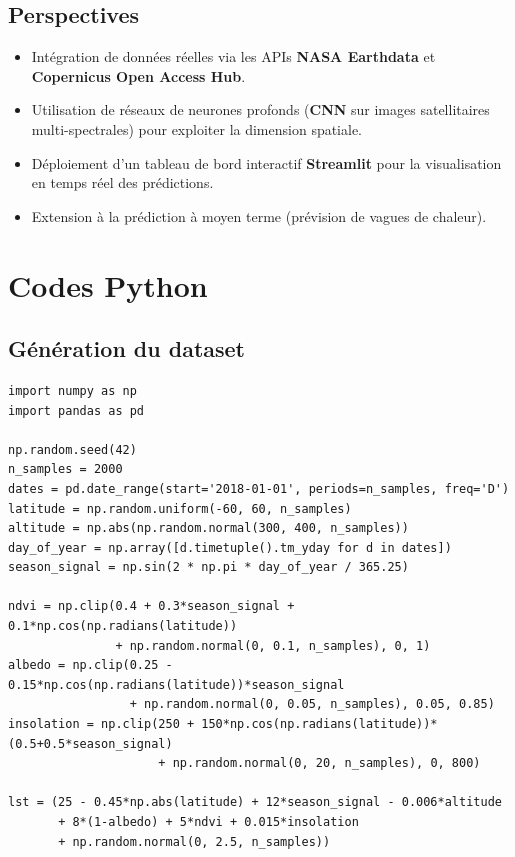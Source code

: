 \documentclass[a4paper,12pt]{report}
\begin{document}
\section{Perspectives}

\begin{itemize}[leftmargin=2em]
  \item Int\'egration de donn\'ees r\'eelles via les APIs \textbf{NASA Earthdata} et \textbf{Copernicus Open Access Hub}.
  \item Utilisation de r\'eseaux de neurones profonds (\textbf{CNN} sur images satellitaires multi-spectrales) pour exploiter la dimension spatiale.
  \item D\'eploiement d'un tableau de bord interactif \textbf{Streamlit} pour la visualisation en temps r\'eel des pr\'edictions.
  \item Extension \`a la pr\'ediction \`a moyen terme (pr\'evision de vagues de chaleur).
\end{itemize}

\appendix
\chapter{Codes Python}

\section{G\'en\'eration du dataset}

\begin{lstlisting}[style=python, caption={generate\_dataset.py --- Construction du jeu de donn\'ees satellitaires}]
import numpy as np
import pandas as pd

np.random.seed(42)
n_samples = 2000
dates = pd.date_range(start='2018-01-01', periods=n_samples, freq='D')
latitude = np.random.uniform(-60, 60, n_samples)
altitude = np.abs(np.random.normal(300, 400, n_samples))
day_of_year = np.array([d.timetuple().tm_yday for d in dates])
season_signal = np.sin(2 * np.pi * day_of_year / 365.25)

ndvi = np.clip(0.4 + 0.3*season_signal + 0.1*np.cos(np.radians(latitude))
               + np.random.normal(0, 0.1, n_samples), 0, 1)
albedo = np.clip(0.25 - 0.15*np.cos(np.radians(latitude))*season_signal
                 + np.random.normal(0, 0.05, n_samples), 0.05, 0.85)
insolation = np.clip(250 + 150*np.cos(np.radians(latitude))*(0.5+0.5*season_signal)
                     + np.random.normal(0, 20, n_samples), 0, 800)

lst = (25 - 0.45*np.abs(latitude) + 12*season_signal - 0.006*altitude
       + 8*(1-albedo) + 5*ndvi + 0.015*insolation
       + np.random.normal(0, 2.5, n_samples))
\end{lstlisting}
\end{document}
